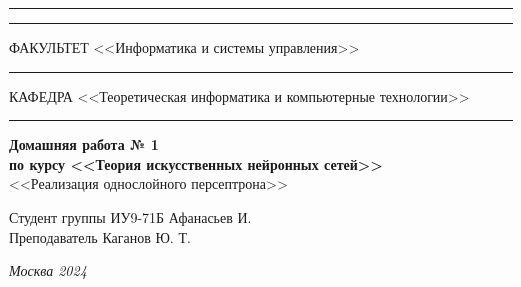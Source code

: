 \documentclass[a4paper, 14pt]{extarticle}
\begin{document}
\begin{titlepage}
\vspace{-25pt}
\hspace{-35pt}\rule{\textwidth}{2.3pt}

\vspace*{-20.3pt}
\hspace{-35pt}\rule{\textwidth}{0.4pt}

\vspace{1.5ex}
\hspace{-35pt} \noindent \small ФАКУЛЬТЕТ\hspace{80pt} <<Информатика и системы управления>>

\vspace*{-16pt}
\hspace{47pt}\rule{0.83\textwidth}{0.4pt}

\vspace{0.5ex}
\hspace{-35pt} \noindent \small КАФЕДРА\hspace{50pt} <<Теоретическая информатика и компьютерные технологии>>

\vspace*{-16pt}
\hspace{30pt}\rule{0.866\textwidth}{0.4pt}
  
\vspace{11em}

\begin{center}
\Large {\bf Домашняя работа № 1} \\ 
\large {\bf по курсу <<Теория искусственных нейронных сетей>>} \\
\large <<Реализация однослойного персептрона>> 
\end{center}\normalsize

\vspace{8em}


\begin{flushright}
  {Студент группы ИУ9-71Б Афанасьев И. \hspace*{15pt}\\ 
  \vspace{2ex}
  Преподаватель Каганов Ю. Т.\hspace*{15pt}}
\end{flushright}

\bigskip

\vfill
 

\begin{center}
\textsl{Москва 2024}
\end{center}
\end{titlepage}
\end{document}
